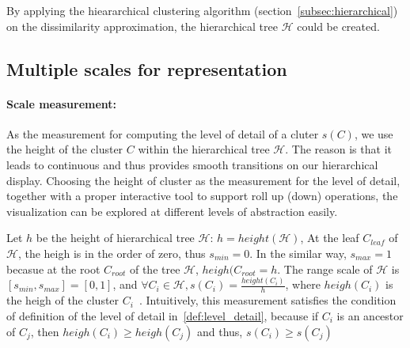 By applying the hieararchical clustering algorithm (section~\ref{subsec:hierarchical}) on the dissimilarity approximation, the hierarchical tree $\mathcal{H}$ could be created.
\subsection{Multiple scales for representation}
\paragraph{Scale measurement: }
As the measurement for computing the level of detail of a cluter $s(C)$, we use the height of the cluster $C$ within the hierarchical tree $\mathcal{H}$. The reason is that it leads to continuous and thus provides smooth transitions on our hierarchical display. Choosing the height of cluster as the measurement for the level of detail, together with a proper interactive tool to support roll up (down) operations, the visualization can be explored at different levels of abstraction easily. 

Let $h$ be the height of hierarchical tree $\mathcal{H}$: $h = height(\mathcal{H})$, At the leaf $C_{leaf}$ of $\mathcal{H}$, the heigh is in the order of zero, thus $s_{min} = 0$. In the similar way, $s_{max} = 1$ becasue at the root $C_{root}$ of the tree $\mathcal{H}$, $heigh(C_{root} = h$.  The range scale of $\mathcal{H}$ is $[s_{min}, s_{max}] = [0,1]$, and $\forall C_i \in \mathcal{H}, s(C_i) = \frac{height(C_i)}{h}$, where $heigh(C_i)$ is the heigh of the cluster $C_i$~\cite{yang2003interactive}. Intuitively, this measurement satisfies the condition of definition of the level of detail in~\ref{def:level_detail}, because if $C_i$ is an ancestor of $C_j$, then $heigh(C_i) \geq heigh(C_j)$ and thus, $s(C_i) \geq s(C_j)$

